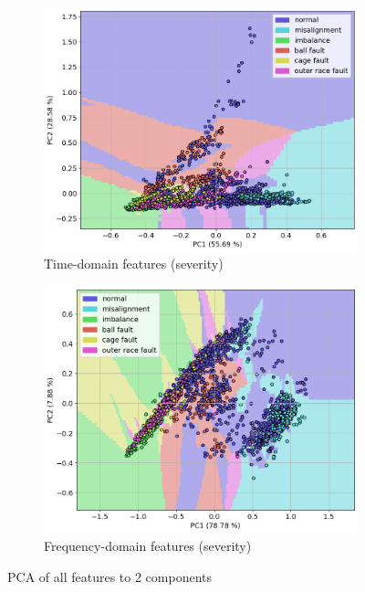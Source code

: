 \begin{figure}[h]
    \begin{subfigure}[b]{0.48\textwidth}
        \includegraphics[width=\textwidth]{assets/results/labels/PCA-TD-severity.png}
        \caption{Time-domain features (severity)}
    \end{subfigure}
    \hfill
    \begin{subfigure}[b]{0.48\textwidth}
        \includegraphics[width=\textwidth]{assets/results/labels/PCA-FD-severity.png}
        \caption{Frequency-domain features (severity)}
    \end{subfigure} 
    \caption{PCA of all features to 2 components}
\end{figure}


